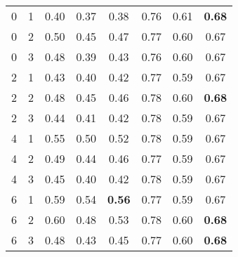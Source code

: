 \begin{table}[htb]
{\begin{tabular}{cc|ccc|ccc}
0 & 1 & 0.40 & 0.37 & 0.38 & 0.76 & 0.61 & \textbf{0.68} \\
0 & 2 & 0.50 & 0.45 & 0.47 & 0.77 & 0.60 & 0.67 \\
0 & 3 & 0.48 & 0.39 & 0.43 & 0.76 & 0.60 & 0.67 \\ \hline
2 & 1 & 0.43 & 0.40 & 0.42 & 0.77 & 0.59 & 0.67 \\
2 & 2 & 0.48 & 0.45 & 0.46 & 0.78 & 0.60 & \textbf{0.68} \\
2 & 3 & 0.44 & 0.41 & 0.42 & 0.78 & 0.59 & 0.67 \\ \hline
4 & 1 & 0.55 & 0.50 & 0.52 & 0.78 & 0.59 & 0.67 \\
4 & 2 & 0.49 & 0.44 & 0.46 & 0.77 & 0.59 & 0.67 \\
4 & 3 & 0.45 & 0.40 & 0.42 & 0.78 & 0.59 & 0.67 \\ \hline
6 & 1 & 0.59 & 0.54 & \textbf{0.56} & 0.77 & 0.59 & 0.67 \\
6 & 2 & 0.60 & 0.48 & 0.53 & 0.78 & 0.60 & \textbf{0.68} \\
6 & 3 & 0.48 & 0.43 & 0.45 & 0.77 & 0.60 & \textbf{0.68} \\
\end{tabular}
}
\end{table}
